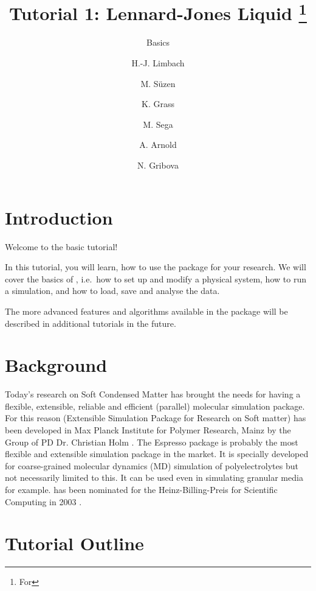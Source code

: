 \documentclass[
paper=a4,                       %
fontsize=11pt,                  %
twoside,                        %
footsepline,                    %
headsepline,                    %
headinclude=false,              %
footinclude=false,              %
pagesize,                       %
]{scrartcl}
\begin{document}
\esptitlehead

\title{Tutorial 1: Lennard-Jones Liquid%
\ifdefined\esversion%
\thanks{For \es \esversion}%
\fi%
}
\subtitle{\es Basics}
\author{H.-J. Limbach \and M. S\"uzen \and K. Grass \and M. Sega \and
  A. Arnold \and N. Gribova}
\maketitle
\tableofcontents

\section{Introduction}

Welcome to the basic \es{} tutorial!

In this tutorial, you will learn, how to use the \es{} package for your 
research. We will cover the basics of \es, i.e.~how to set up and modify a 
physical system, how to run a simulation, and how to load, save and analyse the 
data.

The more advanced features and algorithms available in the \es{} package will 
be described in additional tutorials in the future.

\section{Background}
Today's research on Soft Condensed Matter has brought the needs for having a 
flexible, extensible, reliable and efficient (parallel) molecular simulation 
package. For this reason \es{} (Extensible Simulation Package for Research on 
Soft matter) \cite{esp_url} has been developed in Max Planck Institute for 
Polymer Research, Mainz by the Group of PD Dr. Christian Holm 
\cite{limbach2006ees}. The Espresso package is probably the most flexible and 
extensible simulation package in the market. It is specially developed for 
coarse-grained molecular dynamics (MD) simulation of polyelectrolytes but not 
necessarily limited to this. It can be used even in simulating granular media 
for example. \es{} has been nominated for the Heinz-Billing-Preis for 
Scientific Computing in 2003 \cite{arnold2003ees}.

\section{Tutorial Outline}

% 
% 
% 
% 
\end{document}
